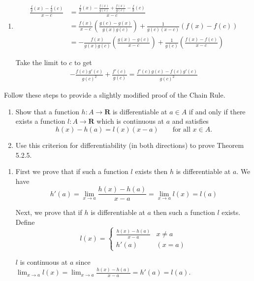 \documentclass{oxmathproblems}
\begin{document}
\begin{questions}
\begin{solution}
\begin{enumerate}[label=(\alph*)]
    \item
    \begin{align*}
       \frac{\frac{f}{g}(x) - \frac{f}{g}(c)}{x-c} &=  \frac{\frac{f}{g}(x) - \frac{f(x)}{g(c)} + \frac{f(x)}{g(c)} - \frac{f}{g}(c)}{x-c}\\
       &= \frac{f(x)}{x-c}\left(\frac{g(c)-g(x)}{g(x)g(c)}\right) + \frac{1}{g(c)(x-c)}\left(f(x)-f(c)\right)\\
       &= -\frac{f(x)}{g(x)g(c)}\left( \frac{g(x)-g(c)}{x-c} \right) + \frac{1}{g(c)} \left( \frac{f(x)-f(c)}{x-c} \right)
    \end{align*}

    Take the limit to $c$ to get
    \begin{align*}
      -\frac{f(c)g'(c)}{g(c)^2} + \frac{f'(c)}{g(c)} = \frac{f'(c)g(c)-f(c)g'(c)}{g(c)^2}
    \end{align*} 
  \end{enumerate}
\end{solution}

\miquestion Follow these steps to provide a slightly modified proof of the Chain Rule.
\begin{enumerate}[label=(\alph*)]
  \item Show that a function $h: A \to \textbf{R}$ is differentiable at $a \in A$ if and only if there exists a function $l : A \to \textbf{R}$ which is continuous at $a$ and satisfies
  \[h(x)-h(a) = l(x)(x-a) \qquad \text{for all } x \in A.\]
  \item Use this criterion for differentiability (in both directions) to prove Theorem 5.2.5.
\end{enumerate}

\begin{solution}
  \begin{enumerate}[label=(\alph*)]
    \item First we prove that if such a function $l$ exists then $h$ is differentiable at $a$. We have
    \[h'(a) = \lim_{x \to a}\frac{h(x)-h(a)}{x-a} = \lim_{x \to a}l(x) = l(a)\]

    Next, we prove that if $h$ is differentiable at $a$ then such a function $l$ exists. Define
    \[
      l(x) = 
      \begin{cases}
        \frac{h(x)-h(a)}{x-a} & x \neq a\\
        h'(a) & (x=a)
      \end{cases}
    \]

    $l$ is continuous at $a$ since $\lim_{x \to a}l(x) = \lim_{x \to a}\frac{h(x)-h(a)}{x-a} = h'(a) = l(a)$.


\end{enumerate}
\end{solution}
\end{questions}
\end{document}
